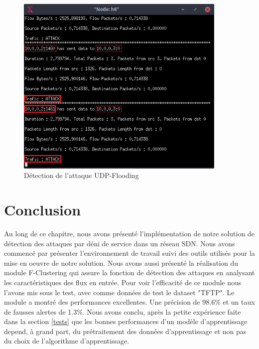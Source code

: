 \begin{figure}[H]
\centering
\includegraphics[width=0.9\textwidth]{Figures/simulation/mininet/IDS/attack_udp_flood}
\decoRule
\caption{Détection de l'attaque UDP-Flooding}
\label{fig:FloodingAttack}
\end{figure}

\section{Conclusion}
Au long de ce chapitre, nous avons présenté l'implémentation de notre solution de détection des attaques par déni de service dans un réseau SDN. Nous avons commencé par présenter l'environnement de travail suivi des outils utilisés pour la mise en oeuvre de notre solution. Nous avons aussi présenté la réalisation du module F-Clustering qui assure la fonction de détection des attaques en analysant les caractéristiques des flux en entrée. Pour voir l'efficacité de ce module nous l'avons mis sous le test, avec comme données de test le dataset "TFTP". Le module a montré des performances excellentes. Une précision de 98.6\% et un taux de fausses alertes de 1.3\%. Nous avons conclu, après la petite expérience faite dans la section \ref{tests} que les bonnes performances d'un modèle d'apprentissage depend, à grand part, du prétraitement des données d'apprentissage et non pas du choix de l'algorithme d'apprentissage.\\


